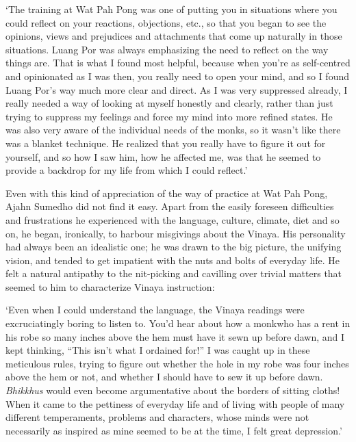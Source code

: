 `The training at Wat Pah Pong was one of putting you in situations where
you could reflect on your reactions, objections, etc., so that you began
to see the opinions, views and prejudices and attachments that come up
naturally in those situations. Luang Por was always emphasizing the need
to reflect on the way things are. That is what I found most helpful,
because when you're as self-centred and opinionated as I was then, you
really need to open your mind, and so I found Luang Por's way much more
clear and direct. As I was very suppressed already, I really needed a
way of looking at myself honestly and clearly, rather than just trying
to suppress my feelings and force my mind into more refined states. He
was also very aware of the individual needs of the monks, so it wasn't
like there was a blanket technique. He realized that you really have to
figure it out for yourself, and so how I saw him, how he affected me,
was that he seemed to provide a backdrop for my life from which I could
reflect.'

Even with this kind of appreciation of the way of practice at Wat Pah
Pong, Ajahn Sumedho did not find it easy. Apart from the easily foreseen
difficulties and frustrations he experienced with the language, culture,
climate, diet and so on, he began, ironically, to harbour misgivings
about the Vinaya. His personality had always been an idealistic one; he
was drawn to the big picture, the unifying vision, and tended to get
impatient with the nuts and bolts of everyday life. He felt a natural
antipathy to the nit-picking and cavilling over trivial matters that
seemed to him to characterize Vinaya instruction:

`Even when I could understand the language, the Vinaya readings were
excruciatingly boring to listen to. You'd hear about how a monkwho has a
rent in his robe so many inches above the hem must have it sewn up
before dawn, and I kept thinking, ``This isn't what I ordained for!'' I
was caught up in these meticulous rules, trying to figure out whether
the hole in my robe was four inches above the hem or not, and whether I
should have to sew it up before dawn. \emph{Bhikkhus} would even become
argumentative about the borders of sitting cloths! When it came to the
pettiness of everyday life and of living with people of many different
temperaments, problems and characters, whose minds were not necessarily
as inspired as mine seemed to be at the time, I felt great depression.'

